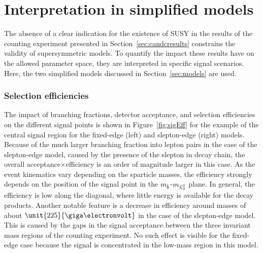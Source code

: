 \section{Interpretation in simplified models}
The absence of a clear indication for the existence of SUSY in the results of the counting experiment presented in Section~\ref{sec:candcresults} constrains the validity of supersymmetric models. To quantify the impact these results have on the allowed parameter space, they are interpreted in specific signal scenarios. Here, the two simplified models discussed in Section~\ref{sec:models} are used. 

\subsubsection{Selection efficiencies}
The impact of branching fractions, detector acceptance, and selection efficiencies on the different signal points is shown in Figure~\ref{fig:sigEff} for the example of the central signal region for the fixed-edge (left) and slepton-edge (right) models. Because of the much larger branching fraction into lepton pairs in the case of the slepton-edge model, caused by the presence of the slepton in decay chain, the overall acceptance$\times$efficiency is an order of magnitude larger in this case. As the event kinematics vary depending on the sparticle masses, the efficiency strongly depends on the position of the signal point in the $m_{\tilde{b}}$-$m_{{\tilde{\chi}^0_2}}$ plane. In general, the efficiency is low along the diagonal, where little energy is available for the decay products. Another notable feature is a decrease in efficiency around \secondchi masses of about $\unit{225}{\giga\electronvolt}$ in the case of the slepton-edge model. This is caused by the gaps in the signal acceptance between the three invariant mass regions of the counting experiment. No such effect is visible for the fixed-edge case because the signal is concentrated in the low-mass region in this model.  
